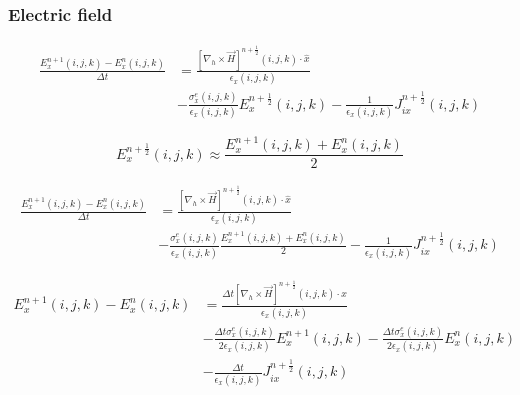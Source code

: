 \documentclass[10pt]{article}
\begin{document}
\subsubsection{Electric field}

\begin{equation}
	\begin{aligned}
		\frac{E^{n+1}_{x}(i,j,k) - E_{x}^{n}(i,j,k)}{\Delta t} & =
		\frac{\left[ \nabla_h \times \vec{H} \right]^{n+\frac{1}{2}}(i,j,k) \cdot \hat{x}}{\epsilon_{{x}}(i,j,k)}                                   \\
		                                                       & - \frac{\sigma^{e}_{x}(i,j,k)}{\epsilon_{x}(i,j,k)} E^{n+\frac{1}{2}}_{x}(i,j,k)
		- \frac{1}{\epsilon_{x}(i,j,k)} J^{n+\frac{1}{2}}_{ix}(i,j,k)
	\end{aligned}
\end{equation}

\begin{equation}
	E^{n+\frac{1}{2}}_{x}(i,j,k) \approx \frac{E^{n+1}_{x}(i,j,k)+E^{n}_{x}(i,j,k)}{2}
\end{equation}

\begin{equation}
	\begin{aligned}
		\frac{E^{n+1}_{x}(i,j,k) - E^{n}_{x}(i,j,k)}{\Delta t} & =
		\frac{\left[ \nabla_h \times \vec{H} \right]^{n+\frac{1}{2}}(i,j,k) \cdot \hat{x}}{\epsilon_{{x}}(i,j,k)}                                                     \\
		                                                       & - \frac{\sigma^{e}_{x}(i,j,k)}{\epsilon_{x}(i,j,k)}  \frac{E^{n+1}_{x}(i,j,k)+E^{n}_{x}(i,j,k)}{2}
		- \frac{1}{\epsilon_{x}(i,j,k)} J^{n+\frac{1}{2}}_{ix}(i,j,k)
	\end{aligned}
\end{equation}

\begin{equation}
	\begin{aligned}
		E^{n+1}_{x}(i,j,k) - E^{n}_{x}(i,j,k) & =
		\frac{\Delta t \left[ \nabla_h \times \vec{H} \right]^{n+\frac{1}{2}}(i,j,k) \cdot \hat{x}}{\epsilon_{{x}}(i,j,k)}                                                                                        \\
		                                      & - \frac{\Delta t\sigma^{e}_{x}(i,j,k)}{2\epsilon_{x}(i,j,k)}  E^{n+1}_{x}(i,j,k)- \frac{\Delta t\sigma^{e}_{x}(i,j,k)}{2\epsilon_{x}(i,j,k)}   E^{n}_{x}(i,j,k) \\
		                                      & - \frac{\Delta t}{\epsilon_{x}(i,j,k)} J^{n+\frac{1}{2}}_{ix}(i,j,k)
	\end{aligned}
\end{equation}
\end{document}
